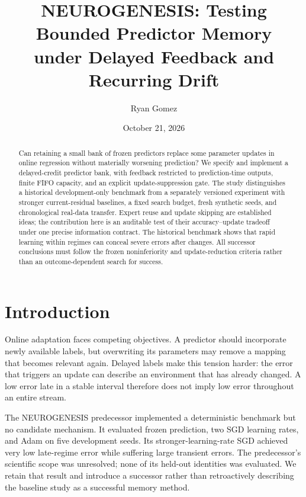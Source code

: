 \documentclass[10pt]{article}
\title{NEUROGENESIS: Testing Bounded Predictor Memory\\under Delayed Feedback and Recurring Drift}
\author{Ryan Gomez}
\date{October 21, 2026}
\begin{document}
\maketitle
\begin{abstract}
Can retaining a small bank of frozen predictors replace some parameter updates in online regression without materially worsening prediction? We specify and implement a delayed-credit predictor bank, with feedback restricted to prediction-time outputs, finite FIFO capacity, and an explicit update-suppression gate. The study distinguishes a historical development-only benchmark from a separately versioned experiment with stronger current-residual baselines, a fixed search budget, fresh synthetic seeds, and chronological real-data transfer. Expert reuse and update skipping are established ideas; the contribution here is an auditable test of their accuracy--update tradeoff under one precise information contract. The historical benchmark shows that rapid learning within regimes can conceal severe errors after changes. All successor conclusions must follow the frozen noninferiority and update-reduction criteria rather than an outcome-dependent search for success.
\end{abstract}

\section{Introduction}
Online adaptation faces competing objectives. A predictor should incorporate newly available labels, but overwriting its parameters may remove a mapping that becomes relevant again. Delayed labels make this tension harder: the error that triggers an update can describe an environment that has already changed. A low error late in a stable interval therefore does not imply low error throughout an entire stream.

The NEUROGENESIS predecessor implemented a deterministic benchmark but no candidate mechanism. It evaluated frozen prediction, two SGD learning rates, and Adam on five development seeds. Its stronger-learning-rate SGD achieved very low late-regime error while suffering large transient errors. The predecessor's scientific scope was unresolved; none of its held-out identities was evaluated. We retain that result and introduce a successor rather than retroactively describing the baseline study as a successful memory method.
\end{document}

